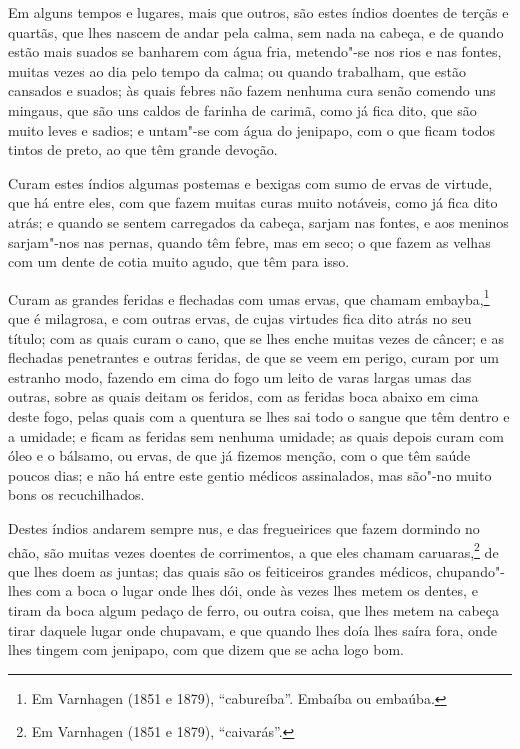 Em alguns tempos e lugares, mais que outros, são estes índios doentes de terçãs e quartãs,
que lhes nascem de andar pela calma, sem nada na cabeça, e de quando estão mais suados se
banharem com água fria, metendo"-se nos rios e nas fontes, muitas vezes ao dia pelo tempo
da calma; ou quando trabalham, que estão cansados e suados; às quais febres não fazem
nenhuma cura senão comendo uns mingaus, que são uns caldos de farinha de carimã, como já
fica dito, que são muito leves e sadios; e untam"-se com água do jenipapo, com o que ficam
todos tintos de preto, ao que têm grande devoção.

Curam estes índios algumas postemas e bexigas com sumo de ervas de virtude, que há entre
eles, com que fazem muitas curas muito notáveis, como já fica dito atrás; e quando se
sentem carregados da cabeça, sarjam nas fontes, e aos meninos sarjam"-nos nas pernas, quando
têm febre, mas em seco; o que fazem as velhas com um dente de cotia muito agudo, que têm
para isso.

Curam as grandes feridas e flechadas com umas ervas, que chamam embayba,\footnote{ Em
Varnhagen (1851 e 1879), ``cabureíba''. Embaíba ou embaúba.} que é milagrosa, e com
outras ervas, de cujas virtudes fica dito atrás no seu título; com as quais curam o cano,
que se lhes enche muitas vezes de câncer; e as flechadas penetrantes e outras feridas, de
que se veem em perigo, curam por um estranho modo, fazendo em cima do fogo um leito de
varas largas umas das outras, sobre as quais deitam os feridos, com as feridas boca abaixo
em cima deste fogo, pelas quais com a quentura se lhes sai todo o sangue que têm dentro e
a umidade; e ficam as feridas sem nenhuma umidade; as quais depois curam com óleo e o
bálsamo, ou ervas, de que já fizemos menção, com o que têm saúde poucos dias; e não há
entre este gentio médicos assinalados, mas são"-no muito bons os recuchilhados.


Destes índios andarem sempre nus, e das fregueirices que fazem dormindo no chão, são
muitas vezes doentes de corrimentos, a que eles chamam caruaras,\footnote{ Em Varnhagen
(1851 e 1879), ``caivarás''.} de que lhes doem as juntas; das quais são os feiticeiros
grandes médicos, chupando"-lhes com a boca o lugar onde lhes dói, onde às vezes lhes metem
os dentes, e tiram da boca algum pedaço de ferro, ou outra coisa, que lhes metem na cabeça
tirar daquele lugar onde chupavam, e que quando lhes doía lhes saíra fora, onde lhes
tingem com jenipapo, com que dizem que se acha logo bom.

